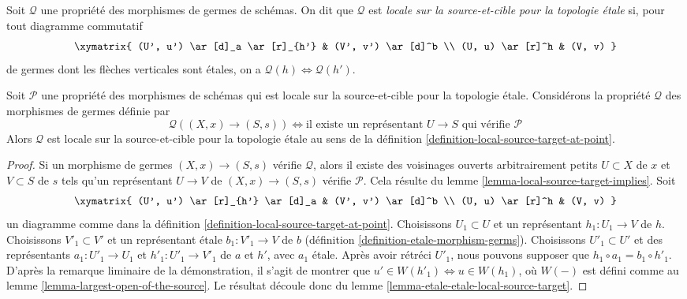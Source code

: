 \begin{definition}
\label{definition-local-source-target-at-point}
Soit $\mathcal{Q}$ une propriété des morphismes de germes de schémas.
On dit que $\mathcal{Q}$ est {\it locale sur la source-et-cible pour la
topologie \'etale} si, pour tout diagramme commutatif
$$
\xymatrix{
(U', u') \ar[d]_a \ar[r]_{h'} & (V', v') \ar[d]^b \\
(U, u) \ar[r]^h & (V, v)
}
$$
de germes dont les flèches verticales sont étales, on a
$\mathcal{Q}(h) \Leftrightarrow \mathcal{Q}(h')$.
\end{definition}

\begin{lemma}
\label{lemma-local-source-target-global-implies-local}
Soit $\mathcal{P}$ une propriété des morphismes de schémas
qui est locale sur la source-et-cible pour la topologie \'etale.
Considérons la propriété $\mathcal{Q}$ des morphismes de germes définie par
$$
\mathcal{Q}((X, x) \to (S, s))
\Leftrightarrow
\text{il existe un représentant }U \to S
\text{ qui vérifie }\mathcal{P}
$$
Alors $\mathcal{Q}$ est locale sur la source-et-cible pour la topologie
\'etale au sens de la
définition \ref{definition-local-source-target-at-point}.
\end{lemma}

\begin{proof}
Si un morphisme de germes $(X, x) \to (S, s)$ vérifie $\mathcal{Q}$,
alors il existe des voisinages ouverts arbitrairement petits
$U \subset X$ de $x$ et $V \subset S$ de $s$ tels qu'un représentant
$U \to V$ de $(X, x) \to (S, s)$ vérifie $\mathcal{P}$.
Cela résulte du lemme \ref{lemma-local-source-target-implies}. Soit
$$
\xymatrix{
(U', u') \ar[r]_{h'} \ar[d]_a & (V', v') \ar[d]^b \\
(U, u) \ar[r]^h & (V, v)
}
$$
un diagramme comme dans la
définition \ref{definition-local-source-target-at-point}.
Choisissons $U_1 \subset U$ et un représentant $h_1 : U_1 \to V$ de $h$.
Choisissons $V'_1 \subset V'$ et un représentant \'etale
$b_1 : V'_1 \to V$ de $b$
(définition \ref{definition-etale-morphism-germs}).
Choisissons $U'_1 \subset U'$ et des représentants
$a_1 : U'_1 \to U_1$ et $h'_1 : U'_1 \to V'_1$ de $a$ et $h'$,
avec $a_1$ \'etale. Après avoir rétréci $U'_1$, nous pouvons supposer que
$h_1 \circ a_1 = b_1 \circ h'_1$. D'après la remarque liminaire de la
démonstration, il s'agit de montrer que
$u' \in W(h'_1) \Leftrightarrow u \in W(h_1)$, où $W(-)$ est défini comme
au lemme \ref{lemma-largest-open-of-the-source}.
Le résultat découle donc du
lemme \ref{lemma-etale-etale-local-source-target}.
\end{proof}

